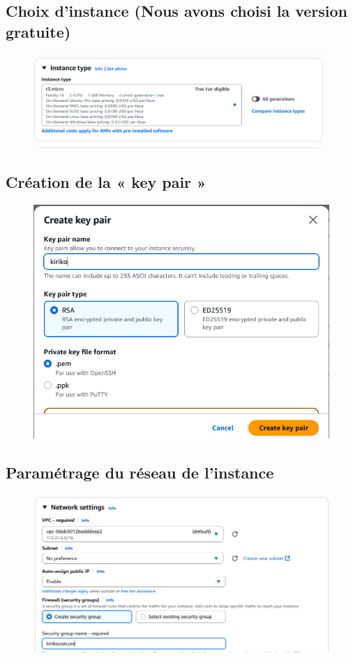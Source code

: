 \subsection{Choix d’instance (Nous avons choisi la version gratuite)}
\begin{figure}[h!]
	\centering
	\includegraphics[width=0.9\linewidth]{corps/images/image3}
	\label{fig:3}
\end{figure}
\newpage
\subsection{Création de la « key pair »}
\begin{figure}[h!]
	\centering
	\includegraphics[width=0.7\linewidth]{corps/images/image4}
	\label{fig:4}
\end{figure}

\subsection{Paramétrage du réseau de l’instance}
\begin{figure}[h!]
	\centering
	\includegraphics[width=0.8\linewidth]{corps/images/image5}
	\label{fig:5}
\end{figure}
\newpage
